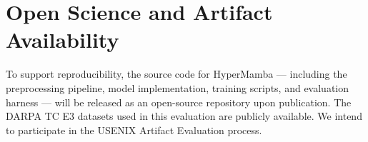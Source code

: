 \documentclass[letterpaper,twocolumn,10pt]{article}
\begin{document}
\section*{Open Science and Artifact Availability}

To support reproducibility, the source code for HyperMamba --- including the preprocessing pipeline, model implementation, training scripts, and evaluation harness --- will be released as an open-source repository upon publication. The DARPA TC E3 datasets used in this evaluation are publicly available. We intend to participate in the USENIX Artifact Evaluation process.



\end{document}
